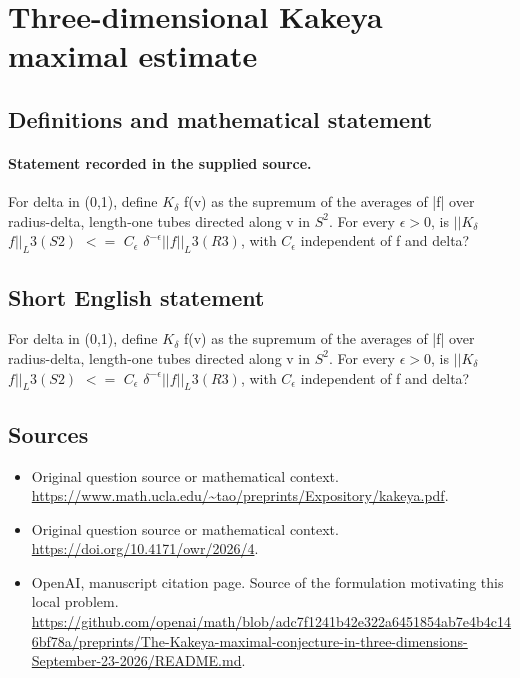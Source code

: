 \documentclass[11pt]{article}
\begin{document}
\section*{Three-dimensional Kakeya maximal estimate}\label{statement}
\subsection{Definitions and mathematical statement}
\paragraph{Statement recorded in the supplied source.}
For delta in (0,1), define $K_\delta $ f(v) as the supremum of the averages of |f| over radius-delta, length-one tubes directed along v in $S^2$. For every $\epsilon >0$, is $||K_\delta $ $f||_L3(S2)$ $<=$ $C_\epsilon $ $\delta ^{-\epsilon }||f||_L3(R3)$, with $C_\epsilon $ independent of f and delta?
\subsection{Short English statement}
For delta in (0,1), define $K_\delta $ f(v) as the supremum of the averages of |f| over radius-delta, length-one tubes directed along v in $S^2$. For every $\epsilon >0$, is $||K_\delta $ $f||_L3(S2)$ $<=$ $C_\epsilon $ $\delta ^{-\epsilon }||f||_L3(R3)$, with $C_\epsilon $ independent of f and delta?
\subsection{Sources}
\begin{itemize}
\item[S1] Original question source or mathematical context.
\url{https://www.math.ucla.edu/~tao/preprints/Expository/kakeya.pdf}.
\item[S2] Original question source or mathematical context.
\url{https://doi.org/10.4171/owr/2026/4}.
\item[S3] OpenAI, manuscript citation page. Source of the formulation motivating this local problem.
\url{https://github.com/openai/math/blob/adc7f1241b42e322a6451854ab7e4b4c146bf78a/preprints/The-Kakeya-maximal-conjecture-in-three-dimensions-September-23-2026/README.md}.
\end{itemize}
\end{document}
